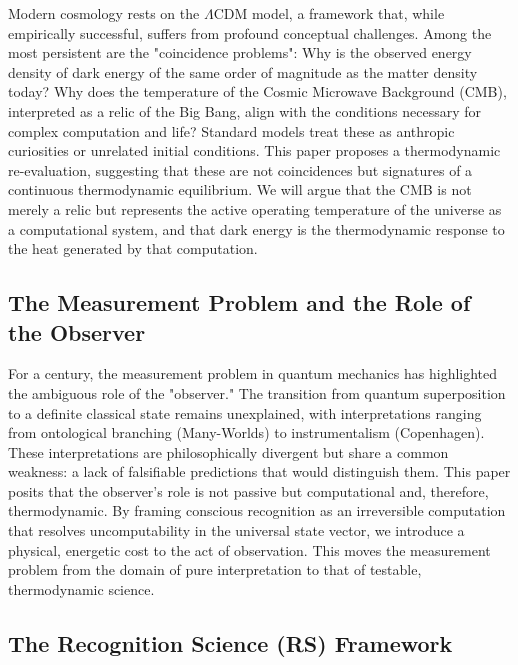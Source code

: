 \documentclass[12pt, aip, jcp]{revtex4-2} %
\begin{document}
Modern cosmology rests on the \(\Lambda\)CDM model, a framework that, while empirically successful, suffers from profound conceptual challenges. Among the most persistent are the "coincidence problems": Why is the observed energy density of dark energy of the same order of magnitude as the matter density today? Why does the temperature of the Cosmic Microwave Background (CMB), interpreted as a relic of the Big Bang, align with the conditions necessary for complex computation and life? Standard models treat these as anthropic curiosities or unrelated initial conditions. This paper proposes a thermodynamic re-evaluation, suggesting that these are not coincidences but signatures of a continuous thermodynamic equilibrium. We will argue that the CMB is not merely a relic but represents the active operating temperature of the universe as a computational system, and that dark energy is the thermodynamic response to the heat generated by that computation.

\subsection{The Measurement Problem and the Role of the Observer}

For a century, the measurement problem in quantum mechanics has highlighted the ambiguous role of the "observer." The transition from quantum superposition to a definite classical state remains unexplained, with interpretations ranging from ontological branching (Many-Worlds) to instrumentalism (Copenhagen). These interpretations are philosophically divergent but share a common weakness: a lack of falsifiable predictions that would distinguish them. This paper posits that the observer's role is not passive but computational and, therefore, thermodynamic. By framing conscious recognition as an irreversible computation that resolves uncomputability in the universal state vector, we introduce a physical, energetic cost to the act of observation. This moves the measurement problem from the domain of pure interpretation to that of testable, thermodynamic science.

\subsection{The Recognition Science (RS) Framework}
\end{document}
